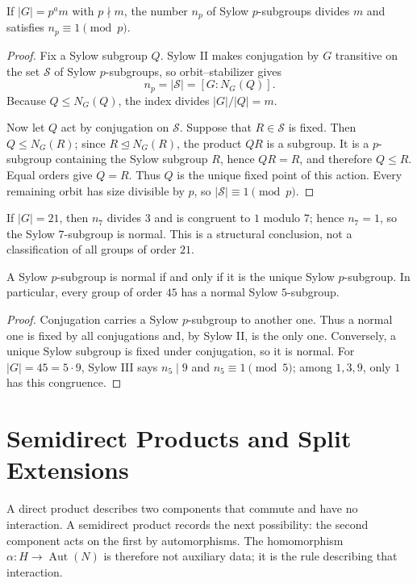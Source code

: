 \begin{theorem}
If \(|G|=p^am\) with \(p\nmid m\), the number \(n_p\) of Sylow
\(p\)-subgroups divides \(m\) and satisfies \(n_p\equiv1\pmod p\).
\end{theorem}
\begin{proof}
Fix a Sylow subgroup \(Q\).  Sylow II makes conjugation by \(G\) transitive
on the set \(\mathcal S\) of Sylow \(p\)-subgroups, so orbit--stabilizer gives
\[n_p=|\mathcal S|=[G:N_G(Q)].\]
Because \(Q\leq N_G(Q)\), the index divides \(|G|/|Q|=m\).

Now let \(Q\) act by conjugation on \(\mathcal S\).  Suppose that \(R\in
\mathcal S\) is fixed.  Then \(Q\leq N_G(R)\); since \(R\trianglelefteq
N_G(R)\), the product \(QR\) is a subgroup.  It is a \(p\)-subgroup
containing the Sylow subgroup \(R\), hence \(QR=R\), and therefore \(Q\leq
R\).  Equal orders give \(Q=R\).  Thus \(Q\) is the unique fixed point of
this action.  Every remaining orbit has size divisible by \(p\), so
\(|\mathcal S|\equiv1\pmod p\).
\end{proof}

\begin{example}
If \(|G|=21\), then \(n_7\) divides \(3\) and is congruent to \(1\) modulo
\(7\); hence \(n_7=1\), so the Sylow \(7\)-subgroup is normal.  This is a
structural conclusion, not a classification of all groups of order \(21\).
\end{example}

\begin{corollary}
A Sylow \(p\)-subgroup is normal if and only if it is the unique Sylow
\(p\)-subgroup.  In particular, every group of order \(45\) has a normal
Sylow \(5\)-subgroup.
\end{corollary}
\begin{proof}
Conjugation carries a Sylow \(p\)-subgroup to another one.  Thus a normal one
is fixed by all conjugations and, by Sylow II, is the only one.  Conversely,
a unique Sylow subgroup is fixed under conjugation, so it is normal.  For
\(|G|=45=5\cdot9\), Sylow III says \(n_5\mid9\) and \(n_5\equiv1\pmod5\);
among \(1,3,9\), only \(1\) has this congruence.
\end{proof}

\section{Semidirect Products and Split Extensions}

A direct product describes two components that commute and have no interaction.
A semidirect product records the next possibility: the second component acts on
the first by automorphisms.  The homomorphism \(\alpha:H\to\operatorname{Aut}(N)\)
is therefore not auxiliary data; it is the rule describing that interaction.

